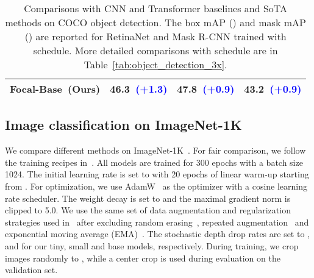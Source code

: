 \documentclass{article}
\begin{document}
\begin{table}[t!]
\begin{minipage}{0.52\linewidth}
{\begin{tabular}{l|l|ll}
    Focal-Base~(Ours) & \textbf{46.3}~\scriptsize{\textcolor{blue}{\bf(+1.3)}} & \textbf{47.8}~\scriptsize{\textcolor{blue}{\bf(+0.9)}} & \textbf{43.2}~\scriptsize{\textcolor{blue}{\bf(+0.9)}} \\
    \bottomrule
    \end{tabular}}
    \vspace{3pt}
    \caption{Comparisons with CNN and Transformer baselines and SoTA methods on COCO object detection. The box mAP () and mask mAP () are reported for RetinaNet and Mask R-CNN trained with  schedule. More detailed comparisons with  schedule are in Table~\ref{tab:object_detection_3x}.}
    \label{tab:object_detection}
\end{minipage}
\end{table}







\subsection{Image classification on ImageNet-1K}

We compare different methods on ImageNet-1K~\cite{deng2009imagenet}. For fair comparison, we follow the training recipes in~\cite{touvron2020training,wang2021pyramid}. All models are trained for 300 epochs with a batch size 1024. The initial learning rate is set to  with 20 epochs of linear warm-up starting from . For optimization, we use AdamW~\cite{loshchilov2017decoupled} as the optimizer with a cosine learning rate scheduler. The weight decay is set to  and the maximal gradient norm is clipped to 5.0. We use the same set of data augmentation and regularization strategies used in~\cite{touvron2020training} after excluding random erasing~\cite{zhong2020random}, repeated augmentation~\cite{berman2019multigrain,hoffer2020augment} and exponential moving average (EMA)~\cite{polyak1992acceleration}. 
The stochastic depth drop rates are set to ,  and  for our tiny, small and base models, respectively. During training, we crop images randomly to , while a center crop is used during evaluation on the validation set.
\end{document}
